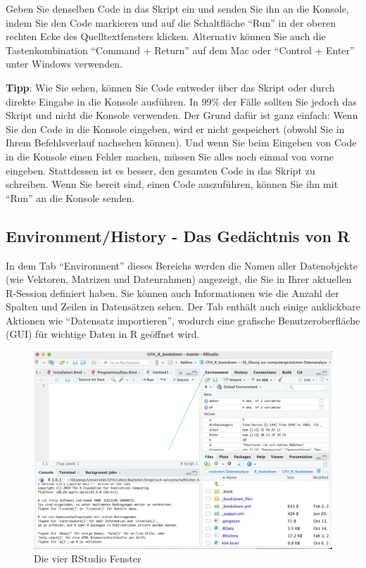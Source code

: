 \documentclass[
]{book}
\begin{document}
Geben Sie denselben Code in das Skript ein und senden Sie ihn an die Konsole, indem Sie den Code markieren und auf die Schaltfläche ``Run'' in der oberen rechten Ecke des Quelltextfensters klicken. Alternativ können Sie auch die Tastenkombination ``Command + Return'' auf dem Mac oder ``Control + Enter'' unter Windows verwenden.

\textbf{Tipp}: Wie Sie sehen, können Sie Code entweder über das Skript oder durch direkte Eingabe in die Konsole ausführen. In 99\% der Fälle sollten Sie jedoch das Skript und nicht die Konsole verwenden. Der Grund dafür ist ganz einfach: Wenn Sie den Code in die Konsole eingeben, wird er nicht gespeichert (obwohl Sie in Ihrem Befehlsverlauf nachsehen können). Und wenn Sie beim Eingeben von Code in die Konsole einen Fehler machen, müssen Sie alles noch einmal von vorne eingeben. Stattdessen ist es besser, den gesamten Code in das Skript zu schreiben. Wenn Sie bereit sind, einen Code auszuführen, können Sie ihn mit ``Run'' an die Konsole senden.

\hypertarget{environmenthistory---das-geduxe4chtnis-von-r}{%
\subsection{Environment/History - Das Gedächtnis von R}\label{environmenthistory---das-geduxe4chtnis-von-r}}

In dem Tab ``Environment'' dieses Bereichs werden die Namen aller Datenobjekte (wie Vektoren, Matrizen und Datenrahmen) angezeigt, die Sie in Ihrer aktuellen R-Session definiert haben. Sie können auch Informationen wie die Anzahl der Spalten und Zeilen in Datensätzen sehen. Der Tab enthält auch einige anklickbare Aktionen wie ``Datensatz importieren'', wodurch eine grafische Benutzeroberfläche (GUI) für wichtige Daten in R geöffnet wird.

\begin{figure}
\includegraphics[width=28.08in]{images/windows_env} \caption{Die vier RStudio Fenster}\label{fig:unnamed-chunk-5}
\end{figure}
\end{document}
